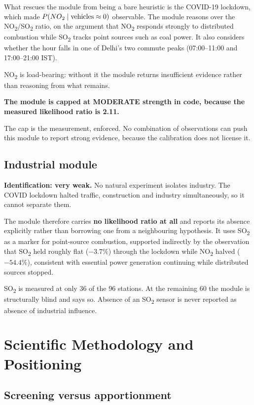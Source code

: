 \documentclass[11pt,a4paper]{article}
\newcommand{\keyclaim}[1]{%
  \par\vspace{0.7ex}\noindent
  \colorbox{vwash}{\parbox{\dimexpr\linewidth-2\fboxsep}{%
    \color{vblack}\textbf{#1}}}%
  \par\vspace{0.9ex}}
\newcommand{\NOx}{NO\textsubscript{2}}
\newcommand{\SOx}{SO\textsubscript{2}}
\begin{document}
What rescues the module from being a bare heuristic is the COVID-19 lockdown, which
made $P(\NOx \mid \text{vehicles} \approx 0)$ observable. The module reasons over
the \NOx{}/\SOx{} ratio, on the argument that \NOx{} responds strongly to
distributed combustion while \SOx{} tracks point sources such as coal power. It also
considers whether the hour falls in one of Delhi's two commute peaks (07:00--11:00
and 17:00--21:00 IST).

\NOx{} is load-bearing: without it the module returns insufficient evidence rather
than reasoning from what remains.

\keyclaim{The module is capped at MODERATE strength in code, because the measured
likelihood ratio is 2.11.}

The cap is the measurement, enforced. No combination of observations can push this
module to report strong evidence, because the calibration does not license it.

\subsection{Industrial module}

\textbf{Identification: very weak.} No natural experiment isolates industry. The
COVID lockdown halted traffic, construction and industry simultaneously, so it
cannot separate them.

The module therefore carries \textbf{no likelihood ratio at all} and reports its
absence explicitly rather than borrowing one from a neighbouring hypothesis. It uses
\SOx{} as a marker for point-source combustion, supported indirectly by the
observation that \SOx{} held roughly flat ($-3.7\%$) through the lockdown while
\NOx{} halved ($-54.4\%$), consistent with essential power generation continuing
while distributed sources stopped.

\SOx{} is measured at only 36 of the 96 stations. At the remaining 60 the module is
structurally blind and says so. Absence of an \SOx{} sensor is never reported as
absence of industrial influence.

\section{Scientific Methodology and Positioning}

\subsection{Screening versus apportionment}
\end{document}
